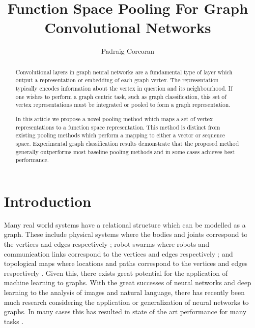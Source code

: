 \documentclass[runningheads]{llncs}
\begin{document}
\title{Function Space Pooling For Graph Convolutional Networks}
\author{Padraig Corcoran}
\maketitle              \begin{abstract}
Convolutional layers in graph neural networks are a fundamental type of layer which output a representation or embedding of each graph vertex. The representation typically encodes information about the vertex in question and its neighbourhood. If one wishes to perform a graph centric task, such as graph classification, this set of vertex representations must be integrated or pooled to form a graph representation.

In this article we propose a novel pooling method which maps a set of vertex representations to a function space representation. This method is distinct from existing pooling methods which perform a mapping to either a vector or sequence space. Experimental graph classification results demonstrate that the proposed method generally outperforms most baseline pooling methods and in some cases achieves best performance.

\end{abstract}
\section{Introduction}
\label{Introduction}
Many real world systems have a relational structure which can be modelled as a graph. These include physical systems where the bodies and joints  correspond to the vertices and edges respectively \cite{sanchez2018graph}; robot swarms where robots and communication links correspond to the vertices and edges respectively \cite{tolstaya2019learning}; and topological maps where locations and paths correspond to the vertices and edges respectively \cite{chen2019behavioral}. Given this, there exists great potential for the application of machine learning to graphs. With the great successes of neural networks and deep learning to the analysis of images and natural language, there has recently been much research considering the application or generalization of neural networks to graphs. In many cases this has resulted in state of the art performance for many tasks \cite{wu2019}.
\end{document}
